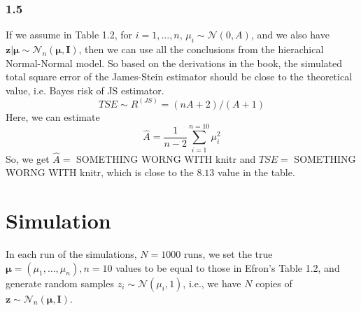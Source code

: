 \documentclass{article}
\newcommand{\rinline}[1]{SOMETHING WORNG WITH knitr}
\begin{document}
\subsubsection*{1.5}
If we assume in Table 1.2, for $i = 1, ..., n$,
$\mu_i \sim \mathcal{N}(0, A)$, and we also have
$\bm{z|\mu} \sim \mathcal{N}_n(\bm{\mu},\bm{I})$, then we can use all the
conclusions from the hierachical Normal-Normal model. \newline
So based on the derivations in the book, the simulated total square
error of the James-Stein estimator should be close to the theoretical 
value, i.e. Bayes risk of JS estimator.
\begin{displaymath}
TSE \sim R^{(JS)} = (nA + 2)/(A+1)
\end{displaymath}
Here, we can estimate
\begin{displaymath}
\hat{A} = \frac{1}{n-2} \sum_{i=1}^{n=10} \mu_i^2
\end{displaymath}
So, we get $\hat{A}=$ \rinline{A.hat} and $TSE=$ \rinline{TSE}, which is
close to the $8.13$ value in the table.


\newpage
\section*{Simulation}
\hspace{12 pt} In each run of the simulations, $N=1000$ runs,
we set the true $\bm{\mu}=(\mu_1,\dots,\mu_n), n=10$ 
values to be equal to those in Efron's Table 1.2, and generate random samples 
$z_i \sim \mathcal{N}(\mu_i,1)$, i.e., we have $N$ copies of
$\bm{z} \sim \mathcal{N}_n(\bm{\mu},\bm{I})$.
\end{document}
